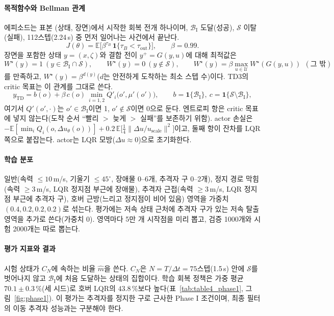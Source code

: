 \documentclass[10pt,a4paper]{article}
\newcommand{\Safe}{\mathcal{S}}
\newcommand{\BaseP}{\mathcal{B}_{\mathrm{I}}}
\begin{document}
\paragraph{목적함수와 Bellman 관계} 에피소드는 표본 (상태, 장면)에서 시작한 회복 전개 하나이며, $\BaseP$ 도달(성공), $\Safe$ 이탈(실패), 112스텝(2.24\,s) 중 먼저 일어나는 사건에서 끝난다.
\begin{equation}
J(\theta)=\mathbb E\big[\beta^{\tau_B}\,\mathbf 1\{\tau_B<\tau_{\mathrm{out}}\}\big],\qquad \beta=0.99 .
\label{eq:sa}
\end{equation}
장면을 포함한 상태 $y=(x,\zeta)$와 결합 전이 $y^+=G(y,u)$에 대해 최적값은
\begin{equation}
W^\star(y)=1\ (y\in\BaseP\cap\Safe),\qquad W^\star(y)=0\ (y\notin\Safe),\qquad W^\star(y)=\beta\max_{u\in\mathcal U}W^\star(G(y,u))\ \ (\text{그 밖})
\end{equation}
를 만족하고, $W^\star(y)=\beta^{d(y)}$($d$는 안전하게 도착하는 최소 스텝 수)이다. TD3의 critic 목표는 이 관계를 그대로 쓴다.
\begin{equation}
y_{\mathrm{TD}}=b(o)+\beta\,c(o)\,\min_{i=1,2}Q'_i\big(o',\mu'(o')\big),\qquad b=\mathbf 1\{\BaseP\},\ c=\mathbf 1\{\Safe\setminus\BaseP\},
\end{equation}
여기서 $Q'(o',\cdot)$는 $o'\in\BaseP$이면 1, $o'\notin\Safe$이면 0으로 둔다. 엔트로피 항은 critic 목표에 넣지 않는다(도착 순서 ``빨리 $>$ 늦게 $>$ 실패''를 보존하기 위함).
actor 손실은 $-\mathbb E[\min_iQ_i(o,\Delta u_\theta(o))]+0.2\,\mathbb E\big[\tfrac14\|\Delta u/u_{\mathrm{scale}}\|^2\big]$이고, 둘째 항이 잔차를 LQR 쪽으로 붙잡는다. actor는 LQR 모방($\Delta u\approx0$)으로 초기화한다.

\paragraph{학습 분포} 일반(속력 $\le10$\,m/s, 기울기 $\le45^\circ$, 장애물 0--6개, 추격자 구 0--2개), 정지 경로 막힘(속력 $\ge3$\,m/s, LQR 정지점 부근에 장애물), 추격자 근접(속력 $\ge3$\,m/s, LQR 정지점 부근에 추격자 구), 호버 근방(느리고 정지점이 비어 있음) 영역을 가중치 $(0.4,0.2,0.2,0.2)$로 섞는다.
평가에는 저속 상태 근처에 추격자 구가 있는 저속 탈출 영역을 추가로 쓴다(가중치 0). 영역마다 5만 개 시작점을 미리 뽑고, 검증 1000개와 시험 2000개는 따로 뽑는다.

\paragraph{평가 지표와 결과} 시험 상태가 $C_N$에 속하는 비율 $\hat m$을 쓴다. $C_N$은 $N=T/\Delta t=75$스텝(1.5\,s) 안에 $\Safe$를 벗어나지 않고 $\BaseP$에 처음 도달하는 상태의 집합이다.
학습 회복 정책은 가중 평균 $70.1\pm0.3\,\%$(세 시드)로 호버 LQR의 $43.8\,\%$보다 높다(표~\ref{tab:table4_phase1}, 그림~\ref{fig:phase1}).
이 평가는 추격자를 정지한 구로 근사한 Phase I 조건이며, 최종 필터의 이동 추격자 성능과는 구분해야 한다.
\end{document}

